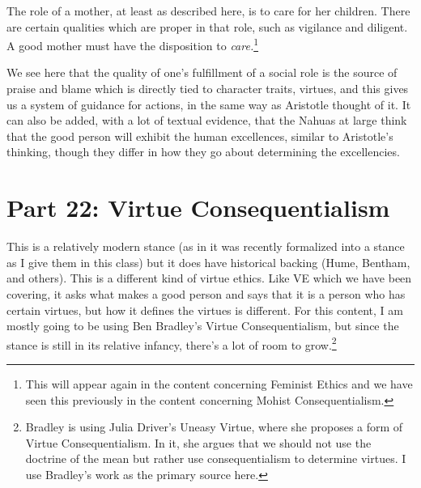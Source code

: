 The role of a mother, at least as described here, is to care for her children. There are certain qualities which are proper in that role, such as vigilance and diligent. A good mother must have the disposition to \emph{care.}\footnote{This will appear again in the content concerning Feminist Ethics and we have seen this previously in the content concerning Mohist Consequentialism.} 

We see here that the quality of one's fulfillment of a social role is the source of praise and blame which is directly tied to character traits, virtues, and this gives us a system of guidance for actions, in the same way as Aristotle thought of it. It can also be added, with a lot of textual evidence, that the Nahuas at large think that the good person will exhibit the human excellences, similar to Aristotle's thinking, though they differ in how they go about determining the excellencies.

\chapter{Part 22: Virtue Consequentialism}

This is a relatively modern stance (as in it was recently formalized into a stance as I give them in this class) but it does have historical backing (Hume, Bentham, and others). This is a different kind of virtue ethics. Like VE which we have been covering, it asks what makes a good person and says that it is a person who has certain virtues, but how it defines the virtues is different. For this content, I am mostly going to be using Ben Bradley’s Virtue Consequentialism,\autocite{Bradley1} but since the stance is still in its relative infancy, there’s a lot of room to grow.\footnote{Bradley is using Julia Driver's Uneasy Virtue, where she proposes a form of Virtue Consequentialism. In it, she argues that we should not use the doctrine of the mean but rather use consequentialism to determine virtues. I use Bradley's work as the primary source here.}

